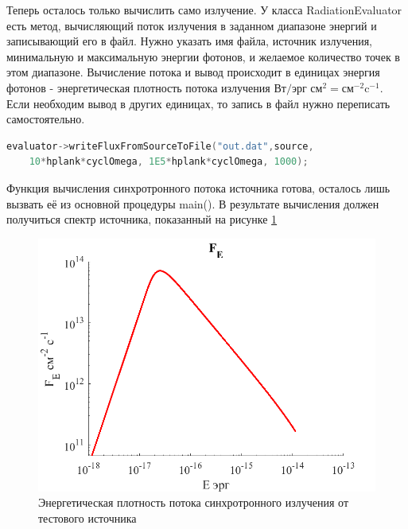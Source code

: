 Теперь осталось только вычислить само излучение. У класса RadiationEvaluator есть метод, вычисляющий поток излучения в заданном диапазоне энергий и записывающий его в файл. Нужно указать имя файла, источник излучения, минимальную и максимальную энергии фотонов, и желаемое количество точек в этом диапазоне. Вычисление потока и вывод происходит в единицах энергия фотонов - энергетическая плотность потока излучения $\text{Вт}/ \text{эрг } {\text{см}}^2 = {\text{см}}^{-2} {\text{c}}^{-1}$. Если необходим вывод в других единицах, то запись в файл нужно переписать самостоятельно. 

\begin{lstlisting}[language=c++]
	evaluator->writeFluxFromSourceToFile("out.dat",source, 
	10*hplank*cyclOmega, 1E5*hplank*cyclOmega, 1000);
\end{lstlisting}


Функция вычисления синхротронного потока источника готова, осталось лишь вызвать её из основной процедуры main(). В результате вычисления должен получиться спектр источника, показанный на рисунке \ref{example0}
\begin{figure}
	\centering
	\includegraphics[width=12.5 cm]{./fig/example0.png} 
	\caption{Энергетическая плотность потока синхротронного излучения от тестового источника}
	\label{example0}
\end{figure}
